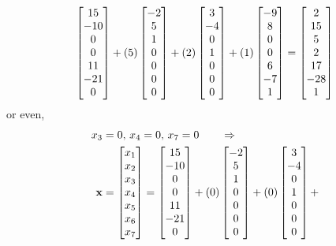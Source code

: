 \documentclass{ximera}
\begin{document}
\begin{example}
\begin{align*}
    \begin{bmatrix}15\\ -10\\ 0\\ 0\\ 11\\ -21\\ 0\end{bmatrix}+
    (5)\begin{bmatrix}-2\\ 5\\ 1\\ 0\\ 0\\ 0\\ 0\end{bmatrix}+
    (2)\begin{bmatrix}3\\ -4\\ 0\\ 1\\ 0\\ 0\\ 0\end{bmatrix}+
    (1)\begin{bmatrix}-9\\ 8\\ 0\\ 0\\ 6\\ -7\\ 1\end{bmatrix}
    =
    \begin{bmatrix}2\\15\\5\\2\\17\\-28\\1\end{bmatrix}
  \end{align*}
  or even,
  \begin{align*}
    x_3&=0,\,
         x_4=0,\,
         x_7=0
         \quad\quad\Rightarrow\\
    \vect{x}&=
              \colvector{x_1\\x_2\\x_3\\x_4\\x_5\\x_6\\x_7}=
    \colvector{15\\ -10\\ 0\\ 0\\ 11\\ -21\\ 0}+
    (0)\colvector{-2\\ 5\\ 1\\ 0\\ 0\\ 0\\ 0}+
    (0)\colvector{3\\ -4\\ 0\\ 1\\ 0\\ 0\\ 0}+

\end{align*}
\end{example}
\end{document}
